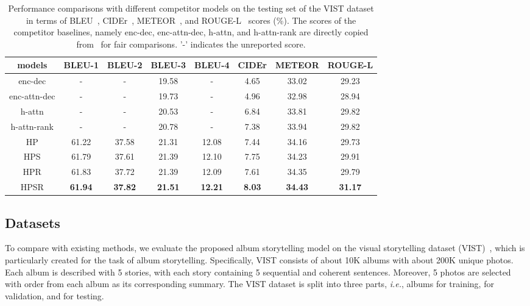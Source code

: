 \documentclass[letterpaper]{article} \usepackage{aaai19}  \usepackage{times}  \usepackage{helvet}  \usepackage{courier}  \usepackage{url}  \usepackage{graphicx}  \usepackage{color}
\begin{document}
\begin{table*}
\begin{center}
\caption{ Performance comparisons with different competitor models on the testing set of the VIST dataset in terms of BLEU~\cite{papineni2002bleu}, CIDEr~\cite{vedantam2015cider}, METEOR~\cite{banerjee2005meteor}, and ROUGE-L~\cite{lin2004rouge} scores (\%).
The scores of the competitor baselines, namely enc-dec, enc-attn-dec, h-attn, and h-attn-rank  are directly copied  from~\cite{yu2017hierarchically} for fair comparisons. '-' indicates the unreported score.}
\label{table:results1}
\begin{adjustbox}{width=0.7\textwidth}
\begin{tabular}{c|c|c|c|c|c|c|c}
\hline
models &BLEU-1  &BLEU-2  & BLEU-3  &BLEU-4 & CIDEr & METEOR  & ROUGE-L \\ \hline \hline
enc-dec & - & - & 19.58 & - & 4.65  & 33.02  &29.23  \\
enc-attn-dec  & - & - & 19.73 & - & 4.96&  32.98  & 28.94  \\
h-attn  & - & - & 20.53  & - & 6.84  & 33.81  & 29.82  \\
h-attn-rank  & - & - & 20.78  & - & 7.38 & 33.94  & 29.82  \\ \hline
HP  & 61.22 & 37.58  & 21.31 & 12.08  & 7.44 & 34.16 & 29.73 \\
HPS   & 61.79 & 37.61 & 21.39  & 12.10 & 7.75 & 34.23  & 29.91 \\
HPR   & 61.83 & 37.72 & 21.39  & 12.09 & 7.61 & 34.35  & 29.79  \\
HPSR  & \textbf{61.94} & \textbf{37.82} & \textbf{21.51}  & \textbf{12.21} & \textbf{8.03}  & \textbf{34.43}  & \textbf{31.17}  \\ \hline
\end{tabular}
\end{adjustbox}
\end{center}
\end{table*}

\subsection{Datasets}
To compare with existing methods, we evaluate the proposed album storytelling model on the visual storytelling dataset (VIST)~\cite{huang2016visual}, which is particularly created for the task of album storytelling.
Specifically, VIST consists of about 10K albums with about 200K unique photos. Each album is described with 5 stories, with each story containing 5 sequential and coherent sentences. Moreover, 5 photos are selected with order from each album as its corresponding summary.  The VIST dataset is split into three parts, \textit{i.e.},  albums for training,  for validation, and  for testing.
\end{document}

